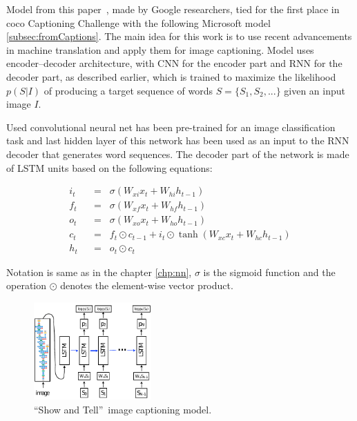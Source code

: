 Model from this paper~\cite{DBLP:journals/corr/VinyalsTBE14}, made by Google researchers, tied for the first place in \gls{coco} Captioning Challenge with the following Microsoft model \ref{subsec:fromCaptions}. The main idea for this work is to use recent advancements in machine translation and apply them for image captioning. Model uses encoder--decoder architecture, with CNN for the encoder part and RNN for the decoder part, as described earlier, which is trained to maximize the likelihood $ p(S|I) $ of producing a target sequence of words $ S = \{S_1,S_2,...\} $ given an input image $ I $.

Used convolutional neural net has been pre-trained for an image classification task and last hidden layer of this network has been used as an input to the RNN decoder that generates word sequences. The decoder part of the network is made of LSTM units based on the following equations:

\belowdisplayskip=24pt
\begin{align}
i_t \hspace{7pt}&=\hspace{7pt} \sigma(W_{xi}x_t + W_{hi}h_{t-1}) \label{eq:showlstm1}\\
f_t \hspace{7pt}&=\hspace{7pt} \sigma(W_{xf}x_t + W_{hf}h_{t-1}) \label{eq:showlstm2}\\
o_t \hspace{7pt}&=\hspace{7pt} \sigma(W_{xo}x_t + W_{ho}h_{t-1}) \label{eq:showlstm3}\\
c_t \hspace{7pt}&=\hspace{7pt} f_t\odot c_{t-1} + i_t\odot\tanh(W_{xc}x_t + W_{hc}h_{t-1}) \label{eq:showlstm4}\\
h_t \hspace{7pt}&=\hspace{7pt} o_t\odot c_t \label{eq:showlstm5}
\end{align}

Notation is same as in the chapter \ref{chp:nn}, $ \sigma $ is the sigmoid function and the operation $ \odot $ denotes the element-wise vector product.

\begin{figure}[!t]
	\centering
	\includegraphics[width=0.4\textwidth]{./fig/show-tell_model.pdf}
	\caption{\textquotedblleft Show and Tell\textquotedblright\ image captioning model.~\cite{DBLP:journals/corr/VinyalsTBE14}
		\label{fig:showmodel}}
\end{figure}

